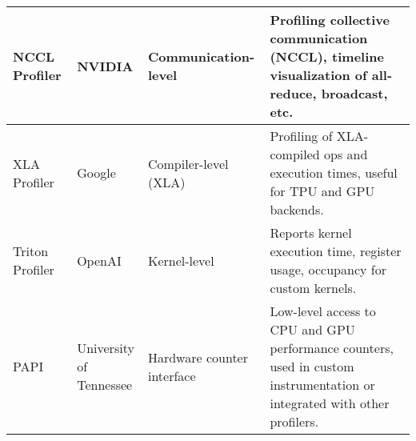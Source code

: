 \begin{table*}[htbp]
\begin{tabular}{|p{3cm}|l|p{3cm}|p{8cm}|}
\textnormal{NCCL Profiler} & NVIDIA & Communication-level & Profiling collective communication (NCCL), timeline visualization of all-reduce, broadcast, etc. \\ \hline
\textnormal{XLA Profiler} & Google & Compiler-level (XLA) & Profiling of XLA-compiled ops and execution times, useful for TPU and GPU backends. \\ \hline
\textnormal{Triton Profiler} & OpenAI & Kernel-level & Reports kernel execution time, register usage, occupancy for custom kernels. \\ \hline
\textnormal{PAPI} & \makecell[l]{University of \\Tennessee} & Hardware counter interface & Low-level access to CPU and GPU performance counters, used in custom instrumentation or integrated with other profilers. \\ \hline

\end{tabular}
\end{table*}
